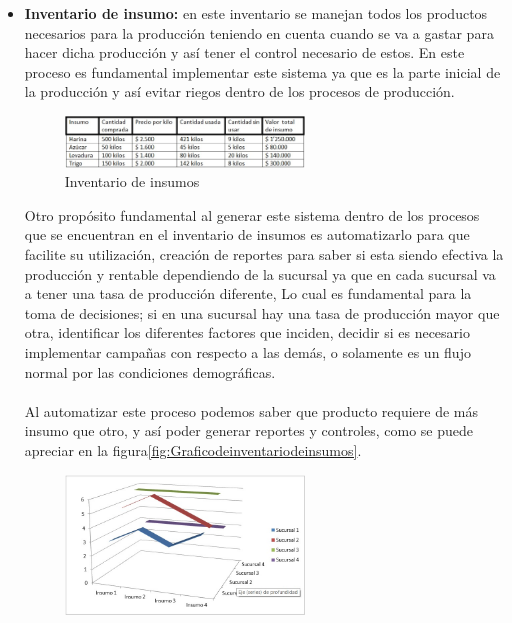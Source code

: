 	\begin{itemize}
		\item \textbf{Inventario de insumo:} en este inventario se manejan todos los productos necesarios para la producci\'on teniendo en cuenta cuando se va a gastar  para hacer dicha producci\'on y as\'i tener el control necesario de estos. En este proceso es fundamental implementar este sistema ya que es la parte inicial de la producci\'on y as\'i evitar riegos dentro de los procesos de producci\'on.
\begin{figure}[htbp]
	\centering
		\includegraphics[width=0.60\textwidth]{images/Inventarioinsumo.jpg}
	\caption{Inventario de insumos}
	\label{fig:Inventariodeinsumo}
\end{figure}%
%	
Otro prop\'osito fundamental al generar este sistema dentro de los procesos que se encuentran en el inventario de insumos es automatizarlo para que facilite su utilizaci\'on, creaci\'on de reportes para saber si esta siendo efectiva la producci\'on y rentable dependiendo de la sucursal ya que en cada sucursal va a tener una tasa de producci\'on diferente, Lo cual es fundamental para la toma de decisiones; si en una sucursal hay una tasa de producci\'on mayor que otra, identificar los diferentes factores que inciden, decidir si es necesario implementar campa\~nas con respecto a las dem\'as, o solamente es un flujo normal por las condiciones demogr\'aficas. 
\\%
\\%
Al automatizar este proceso podemos saber que producto requiere de m\'as insumo que otro, y as\'i poder generar reportes y controles, como se puede apreciar en la figura\ref{fig:Graficodeinventariodeinsumos}.
%
\begin{figure}[htbp]
	\centering
		\includegraphics[width=0.60\textwidth]{images/Graficoinventarioinsumo.jpg}

\end{figure}
\end{itemize}
